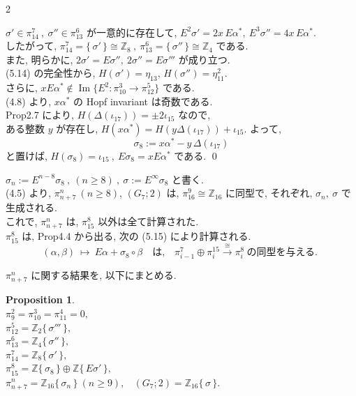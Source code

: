 \documentclass[10pt, leqno]{ltjsarticle}
\newcommand{\gen}[1]{\{\,#1\,\}}       %
\newcommand{\im}{\operatorname{Im}}
\numberwithin{equation}{section}
\theoremstyle{plain}
\newtheorem{proposition}[theorem]{Proposition}
\theoremstyle{definition}
\theoremstyle{remark}
\begin{document}
\begin{paracol}{2}

\noindent
\(\sigma'\in\pi^{7}_{14}\ ,\ \sigma''\in\pi^{6}_{13}\) 
が一意的に存在して,
\(
E^{2}\sigma'=2x\,E\alpha^{\ast},\ E^{3}\sigma''=4x\,E\alpha^{\ast} .
\)\\
したがって,
\(\pi^{7}_{14}=\gen{\sigma'}\cong\mathbb Z_{8}\ , \
\pi_{13}^6=\gen{\sigma''}\cong\mathbb{Z}_4\) である. \\
また, 明らかに, \(2\sigma'=E\sigma'',\ 2\sigma''=E\sigma'''\) が成り立つ. \\
(5.14) の完全性から, 
\(H(\sigma')=\eta_{13}\), \(H(\sigma'')=\eta_{11}^{2} .\)\\
さらに, \(xE\alpha^{\ast}\notin \im\{E^2:\pi_{10}^3\to\pi_{12}^5\}\) である. \\
(4.8) より, \(x\alpha^{\ast}\) の Hopf invariant は奇数である. \\
Prop2.7 により, 
\(H(\Delta(\iota_{17}))=\pm 2\iota_{15}\) なので, \\
ある整数 \(y\) が存在し, 
\(H(x\alpha^{\ast})=H(y\Delta(\iota_{17}))+\iota_{15} .\)
よって, 
\[
\sigma_{8}:=x\alpha^{\ast}-y\,\Delta(\iota_{17})
\]
と置けば, 
\(H(\sigma_{8})=\iota_{15}\ , \ E\sigma_{8}=xE\alpha^{\ast}\)
である. 
\qed

\(\sigma_n :=E^{n-8}\sigma_8\ , \ (n\geq8) \ , \ \sigma:=E^{\infty}\sigma_8\) と書く. \\
(4.5) より, \(\pi_{n+7}^n \ (n\geq8)\),
\((G_7;2)\) は,
\(\pi_{16}^9\cong\mathbb{Z}_{16}\) に同型で, 
それぞれ,
\(\sigma_n,\ \sigma\) で生成される. \\
これで, \(\pi_{n+7}^n\) は, 
\(\pi_{15}^8\) 以外は全て計算された. \\
\(\pi_{15}^8\) は, Prop4.4 から出る, 
次の (5.15) により計算される. 
\begin{equation}\label{eq:5.15}
(\alpha,\beta)\ \longmapsto\ E\alpha+\sigma_{8}\circ\beta
\quad\text{は,}\quad
\pi^{7}_{i-1}\oplus\pi^{15}_{i}\xrightarrow{\cong}\pi^{8}_{i}
\ \text{の同型を与える. }
\end{equation}

\(\pi_{n+7}^n\) に関する結果を, 以下にまとめる. 

\begin{proposition}\label{prop:5.15}
\ \\
\(\pi_9^2=\pi_{10}^3=\pi_{11}^4=0,\) \\
\(\pi^{5}_{12}=\mathbb Z_2\gen{\sigma'''},\) \\
\(\pi^{6}_{13}=\mathbb Z_4\gen{\sigma''},\) \\
\(\pi^{7}_{14}=\mathbb Z_8\gen{\sigma'},\) \\
\(\pi^{8}_{15}=\mathbb Z\gen{\sigma_8}\oplus\mathbb Z\gen{E\sigma'},\) \\
\(\pi^{n}_{n+7}=\mathbb Z_{16}\gen{\sigma_n}\ (n\ge9),\) \
\((G_{7};2)=\mathbb Z_{16}\gen{\sigma}.\)
\end{proposition}


\end{paracol}
\end{document}
